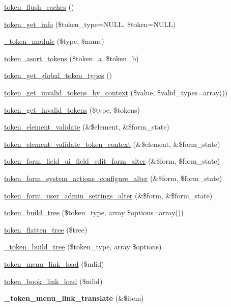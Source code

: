 \begin{DoxyCompactItemize}
\item 
\hyperlink{token_8module_ae34f0dc7cf6af04b24b316b824b2fe27}{token\_\-flush\_\-caches} ()
\item 
\hyperlink{token_8module_a5f133651e755907cb560b5860d44d2c2}{token\_\-get\_\-info} (\$token\_\-type=NULL, \$token=NULL)
\item 
\hyperlink{token_8module_aec2b84752434d0daf6ff455a1f523f51}{\_\-token\_\-module} (\$type, \$name)
\item 
\hyperlink{token_8module_aeb176989ed28ca8726654d28720e782e}{token\_\-asort\_\-tokens} (\$token\_\-a, \$token\_\-b)
\item 
\hyperlink{token_8module_ac36628cb3e63ce348391ca7ec9c628a1}{token\_\-get\_\-global\_\-token\_\-types} ()
\item 
\hyperlink{token_8module_a8a2c76f5c0318bb7834f89c4a32e11f0}{token\_\-get\_\-invalid\_\-tokens\_\-by\_\-context} (\$value, \$valid\_\-types=array())
\item 
\hyperlink{token_8module_a1b020d15d269cf5fa17cb7861d105687}{token\_\-get\_\-invalid\_\-tokens} (\$type, \$tokens)
\item 
\hyperlink{token_8module_acaac5d083e5f83323e9e2914223a729e}{token\_\-element\_\-validate} (\&\$element, \&\$form\_\-state)
\item 
\hyperlink{token_8module_abbe1ab0d6a3c879dd953427f7d0a4f8e}{token\_\-element\_\-validate\_\-token\_\-context} (\&\$element, \&\$form\_\-state)
\item 
\hyperlink{token_8module_aafd876aa871c14cf1c4ed7cc130a7fef}{token\_\-form\_\-field\_\-ui\_\-field\_\-edit\_\-form\_\-alter} (\&\$form, \$form\_\-state)
\item 
\hyperlink{token_8module_a9e90ed1423fef7afcb0f3283cf9fc7c8}{token\_\-form\_\-system\_\-actions\_\-configure\_\-alter} (\&\$form, \$form\_\-state)
\item 
\hyperlink{token_8module_a1631840450884761bfdf41635e55700d}{token\_\-form\_\-user\_\-admin\_\-settings\_\-alter} (\&\$form, \&\$form\_\-state)
\item 
\hyperlink{token_8module_ad32c69ba0eb229c02bf4b49227d49379}{token\_\-build\_\-tree} (\$token\_\-type, array \$options=array())
\item 
\hyperlink{token_8module_a26a3276436562b162a658b74d58acd7f}{token\_\-flatten\_\-tree} (\$tree)
\item 
\hyperlink{token_8module_aa6e563e68ab48c3388196821fe733f1b}{\_\-token\_\-build\_\-tree} (\$token\_\-type, array \$options)
\item 
\hyperlink{token_8module_aa10d2e27b2947c29152b40bc0bb3b495}{token\_\-menu\_\-link\_\-load} (\$mlid)
\item 
\hyperlink{token_8module_a0fa0866bc1e7362481041171d8d173a1}{token\_\-book\_\-link\_\-load} (\$mlid)
\item 
\hypertarget{token_8module_a7c97bbb06d3dc0691c5f7170a1e4cca7}{
{\bfseries \_\-token\_\-menu\_\-link\_\-translate} (\&\$item)}
\label{token_8module_a7c97bbb06d3dc0691c5f7170a1e4cca7}


\end{DoxyCompactItemize}
